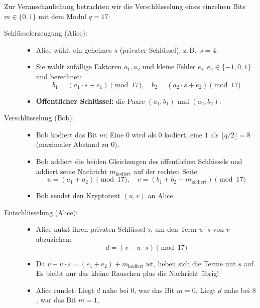 \begin{myprocedure}\label{myprocedure:LWE}
	Zur Veranschaulichung betrachten wir die Verschlüsselung eines einzelnen Bits $m \in \{0, 1\}$ mit dem Modul $q = 17$:
	\begin{description}
		\item[Schlüsselerzeugung (Alice):]
		      \begin{itemize}
			      \item Alice wählt ein geheimes $s$ (privater Schlüssel), z.\,B.\ $s = 4$.
			      \item Sie wählt zufällige Faktoren $a_1, a_2$ und kleine Fehler $e_1, e_2 \in \{-1, 0, 1\}$ und berechnet:
			            \[
				            b_1 = (a_1 \cdot s + e_1) \pmod{17}, \quad b_2 = (a_2 \cdot s + e_2) \pmod{17}
			            \]
			      \item \textbf{Öffentlicher Schlüssel:} die Paare $(a_1, b_1)$ und $(a_2, b_2)$.
		      \end{itemize}
		\item[Verschlüsselung (Bob):]
		      \begin{itemize}
			      \item Bob kodiert das Bit $m$: Eine $0$ wird als $0$ kodiert, eine $1$ als $\lfloor q/2 \rfloor = 8$ (maximaler Abstand zu 0).
			      \item Bob addiert die beiden Gleichungen des öffentlichen Schlüssels und addiert seine Nachricht $m_{\text{kodiert}}$ auf der rechten Seite:
			            \[
				            u = (a_1 + a_2) \pmod{17}, \quad v = (b_1 + b_2 + m_{\text{kodiert}}) \pmod{17}
			            \]
			      \item Bob sendet den Kryptotext $(u, v)$ an Alice.
		      \end{itemize}
		\item[Entschlüsselung (Alice):]
		      \begin{itemize}
			      \item Alice nutzt ihren privaten Schlüssel $s$, um den Term $u \cdot s$ von $v$ abzuziehen:
			            \[
				            d = (v - u \cdot s) \pmod{17}
			            \]
			      \item Da $v - u \cdot s = (e_1 + e_2) + m_{\text{kodiert}}$ ist, heben sich die Terme mit $s$ auf. Es bleibt nur das kleine Rauschen plus die Nachricht übrig!
			      \item Alice rundet: Liegt $d$ nahe bei $0$, war das Bit $m = 0$. Liegt $d$ nahe bei $8$, war das Bit $m = 1$.
		      \end{itemize}
	\end{description}
\end{myprocedure}

